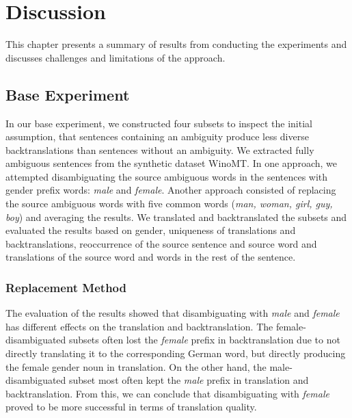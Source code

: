 \chapter{Discussion}
\label{ch:Discussion}

This chapter presents a summary of results from conducting the experiments and discusses challenges and limitations of the approach. 


\section{Base Experiment}
\label{sec:Discussion:Base}

In our base experiment, we constructed four subsets to inspect the initial assumption, that sentences containing an ambiguity produce less diverse backtranslations than sentences without an ambiguity. We extracted fully ambiguous sentences from the synthetic dataset WinoMT. In one approach, we attempted disambiguating the source ambiguous words in the sentences with gender prefix words: \textit{male} and \textit{female}. Another approach consisted of replacing the source ambiguous words with five common words (\textit{man, woman, girl, guy, boy}) and averaging the results. We translated and backtranslated the subsets and evaluated the results based on gender, uniqueness of translations and backtranslations, reoccurrence of the source sentence and source word and translations of the source word and words in the rest of the sentence.

\subsection{Replacement Method} %
The evaluation of the results showed that disambiguating with \textit{male} and \textit{female} has different effects on the translation and backtranslation. The female-disambiguated subsets often lost the \textit{female} prefix in backtranslation due to not directly translating it to the corresponding German word, but directly producing the female gender noun in translation. On the other hand, the male-disambiguated subset most often kept the \textit{male} prefix in translation and backtranslation. From this, we can conclude that disambiguating with \textit{female} proved to be more successful in terms of translation quality.

